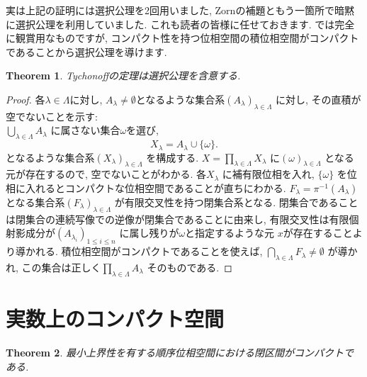 \documentclass[dvipdfmx]{jbook}
\newtheorem{theorem}{Theorem}[section]
\theoremstyle{remark}
\theoremstyle{plain}
\begin{document}
実は上記の証明には選択公理を2回用いました, Zornの補題ともう一箇所で暗黙に選択公理を利用していました. これも読者の皆様に任せておきます. では完全に観賞用なものですが, コンパクト性を持つ位相空間の積位相空間がコンパクトであることから選択公理を導けます.

\begin{theorem}
	Tychonoffの定理は選択公理を含意する.
\end{theorem}

\begin{proof}
	各$\lambda \in \Lambda$に対し, $A_{\lambda} \neq \emptyset$となるような集合系$\left( A_{\lambda} \right) _{\lambda \in \Lambda}$ に対し, その直積が空でないことを示す:\\
	$\bigcup_{\lambda \in  \Lambda} A_{\lambda}$ に属さない集合$\omega$を選び,
	 \[
	X_{\lambda }= A_{\lambda} \cup \{ \omega\} 
	.\] 
	となるような集合系$\left( X_{\lambda} \right) _{\lambda \in \Lambda}$ を構成する. $X = \prod_{\lambda \in \Lambda} X_{\lambda}  $ に$(\omega)_{\lambda \in \Lambda}$ となる元が存在するので, 空でないことがわかる. 各$X_{\lambda}$ に補有限位相を入れ, $\{\omega\} $ を位相に入れるとコンパクトな位相空間であることが直ちにわかる. $F_{\lambda} = \pi ^{-1} \left( A_{\lambda} \right) $ となる集合系$\left( F_{\lambda} \right) _{\lambda \in \Lambda}$ が有限交叉性を持つ閉集合系となる. 閉集合であることは閉集合の連続写像での逆像が閉集合であることに由来し, 有限交叉性は有限個射影成分が$(A_{\lambda_i})_{1\le i \le n}$ に属し残りが$\omega$と指定するような元 $x$が存在することより導かれる. 積位相空間がコンパクトであることを使えば, $\bigcap_{\lambda \in \Lambda} F_{\lambda} \neq \emptyset$ が導かれ, この集合は正しく$\prod_{\lambda \in \Lambda} A_{\lambda}$ そのものである. 
\end{proof}


\section{実数上のコンパクト空間}

\begin{theorem}
	最小上界性を有する順序位相空間における閉区間がコンパクトである.
\end{theorem}
\end{document}
